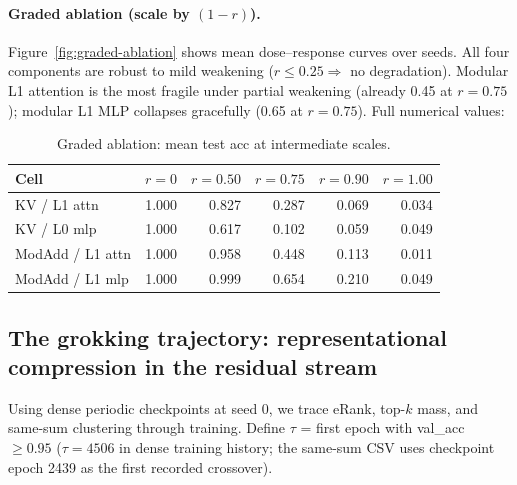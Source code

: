 \documentclass{article}
\begin{document}
\paragraph{Graded ablation (scale by $(1-r)$).}
Figure~\ref{fig:graded-ablation} shows mean dose--response curves over seeds. All four components are robust to mild weakening ($r\le 0.25 \Rightarrow$ no degradation). Modular L1 attention is the most fragile under partial weakening (already 0.45 at $r=0.75$); modular L1 MLP collapses gracefully (0.65 at $r=0.75$). Full numerical values:

\begin{table}[h]
    \centering
    \caption{Graded ablation: mean test acc at intermediate scales.}
    \label{tab:graded}
    \small
    \begin{tabular}{lrrrrr}
        \toprule
        Cell & $r=0$ & $r=0.50$ & $r=0.75$ & $r=0.90$ & $r=1.00$ \\
        \midrule
        KV / L1 attn & 1.000 & 0.827 & 0.287 & 0.069 & 0.034 \\
        KV / L0 mlp & 1.000 & 0.617 & 0.102 & 0.059 & 0.049 \\
        ModAdd / L1 attn & 1.000 & 0.958 & 0.448 & 0.113 & 0.011 \\
        ModAdd / L1 mlp & 1.000 & 0.999 & 0.654 & 0.210 & 0.049 \\
        \bottomrule
    \end{tabular}
\end{table}

\subsection{The grokking trajectory: representational compression in the residual stream}
\label{sec:trajectory}

Using dense periodic checkpoints at seed 0, we trace eRank, top-$k$ mass, and same-sum clustering through training. Define $\tau$ = first epoch with val\_acc $\ge 0.95$ ($\tau=4506$ in dense training history; the same-sum CSV uses checkpoint epoch 2439 as the first recorded crossover).
\end{document}
